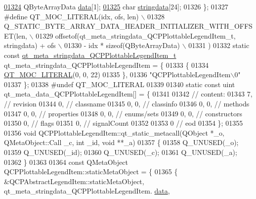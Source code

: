 \begin{DoxyCode}
\hypertarget{a00016_source_l01324}{}\hyperlink{a00016_a56d928faacdea012d9b501b879ef98a8}{01324}     QByteArrayData \hyperlink{a00016_a56d928faacdea012d9b501b879ef98a8}{data}[1];
\hypertarget{a00016_source_l01325}{}\hyperlink{a00016_a25e998eb002b6a9f9e969afa5247748f}{01325}     \textcolor{keywordtype}{char} \hyperlink{a00016_a25e998eb002b6a9f9e969afa5247748f}{stringdata}[24];
01326 \};
01327 \textcolor{preprocessor}{#define QT\_MOC\_LITERAL(idx, ofs, len) \(\backslash\)}
01328 \textcolor{preprocessor}{    Q\_STATIC\_BYTE\_ARRAY\_DATA\_HEADER\_INITIALIZER\_WITH\_OFFSET(len, \(\backslash\)}
01329 \textcolor{preprocessor}{    offsetof(qt\_meta\_stringdata\_QCPPlottableLegendItem\_t, stringdata) + ofs \(\backslash\)}
01330 \textcolor{preprocessor}{        - idx * sizeof(QByteArrayData) \(\backslash\)}
01331 \textcolor{preprocessor}{    )}
01332 \textcolor{keyword}{static} \textcolor{keyword}{const} \hyperlink{a00016_d4/d3e/a00116}{qt\_meta\_stringdata\_QCPPlottableLegendItem\_t} 
      qt\_meta\_stringdata\_QCPPlottableLegendItem = \{
01333     \{
01334 \hyperlink{a00016_a75bb9482d242cde0a06c9dbdc6b83abe}{QT\_MOC\_LITERAL}(0, 0, 22)
01335     \},
01336     \textcolor{stringliteral}{"QCPPlottableLegendItem\(\backslash\)0"}
01337 \};
01338 \textcolor{preprocessor}{#undef QT\_MOC\_LITERAL}
01339 
01340 \textcolor{keyword}{static} \textcolor{keyword}{const} uint qt\_meta\_data\_QCPPlottableLegendItem[] = \{
01341 
01342  \textcolor{comment}{// content:}
01343        7,       \textcolor{comment}{// revision}
01344        0,       \textcolor{comment}{// classname}
01345        0,    0, \textcolor{comment}{// classinfo}
01346        0,    0, \textcolor{comment}{// methods}
01347        0,    0, \textcolor{comment}{// properties}
01348        0,    0, \textcolor{comment}{// enums/sets}
01349        0,    0, \textcolor{comment}{// constructors}
01350        0,       \textcolor{comment}{// flags}
01351        0,       \textcolor{comment}{// signalCount}
01352 
01353        0        \textcolor{comment}{// eod}
01354 \};
01355 
01356 \textcolor{keywordtype}{void} QCPPlottableLegendItem::qt\_static\_metacall(QObject *\_o, QMetaObject::Call \_c, \textcolor{keywordtype}{int} \_id, \textcolor{keywordtype}{void} **\_a)
01357 \{
01358     Q\_UNUSED(\_o);
01359     Q\_UNUSED(\_id);
01360     Q\_UNUSED(\_c);
01361     Q\_UNUSED(\_a);
01362 \}
01363 
01364 \textcolor{keyword}{const} QMetaObject QCPPlottableLegendItem::staticMetaObject = \{
01365     \{ &QCPAbstractLegendItem::staticMetaObject, qt\_meta\_stringdata\_QCPPlottableLegendItem.
      \hyperlink{a00016_a56d928faacdea012d9b501b879ef98a8}{data},

\end{DoxyCode}
